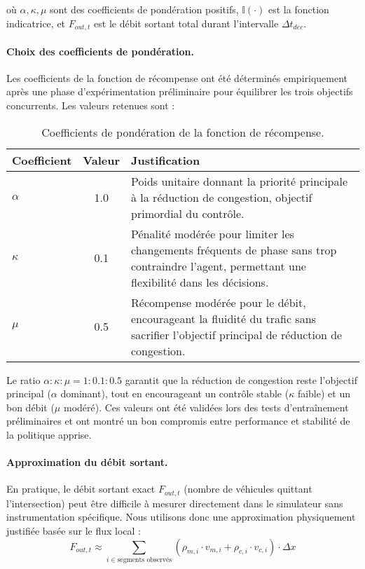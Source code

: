 où $\alpha, \kappa, \mu$ sont des coefficients de pondération positifs, $\mathbb{I}(\cdot)$ est la fonction indicatrice, et $F_{out, t}$ est le débit sortant total durant l'intervalle $\Delta t_{dec}$.

\paragraph{Choix des coefficients de pondération.}
Les coefficients de la fonction de récompense ont été déterminés empiriquement après une phase d'expérimentation préliminaire pour équilibrer les trois objectifs concurrents. Les valeurs retenues sont :

\begin{table}[h]
\centering
\begin{tabular}{lcp{8cm}}
\toprule
\textbf{Coefficient} & \textbf{Valeur} & \textbf{Justification} \\
\midrule
$\alpha$ & 1.0 & Poids unitaire donnant la priorité principale à la réduction de congestion, objectif primordial du contrôle. \\
$\kappa$ & 0.1 & Pénalité modérée pour limiter les changements fréquents de phase sans trop contraindre l'agent, permettant une flexibilité dans les décisions. \\
$\mu$ & 0.5 & Récompense modérée pour le débit, encourageant la fluidité du trafic sans sacrifier l'objectif principal de réduction de congestion. \\
\bottomrule
\end{tabular}
\caption{Coefficients de pondération de la fonction de récompense.}
\label{tab:reward_weights}
\end{table}

Le ratio $\alpha : \kappa : \mu = 1 : 0.1 : 0.5$ garantit que la réduction de congestion reste l'objectif principal ($\alpha$ dominant), tout en encourageant un contrôle stable ($\kappa$ faible) et un bon débit ($\mu$ modéré). Ces valeurs ont été validées lors des tests d'entraînement préliminaires et ont montré un bon compromis entre performance et stabilité de la politique apprise.

\paragraph{Approximation du débit sortant.}
En pratique, le débit sortant exact $F_{out,t}$ (nombre de véhicules quittant l'intersection) peut être difficile à mesurer directement dans le simulateur sans instrumentation spécifique. Nous utilisons donc une approximation physiquement justifiée basée sur le flux local :
\begin{equation}
F_{out, t} \approx \sum_{i \in \text{segments observés}} \left( \rho_{m,i} \cdot v_{m,i} + \rho_{c,i} \cdot v_{c,i} \right) \cdot \Delta x
\end{equation}

